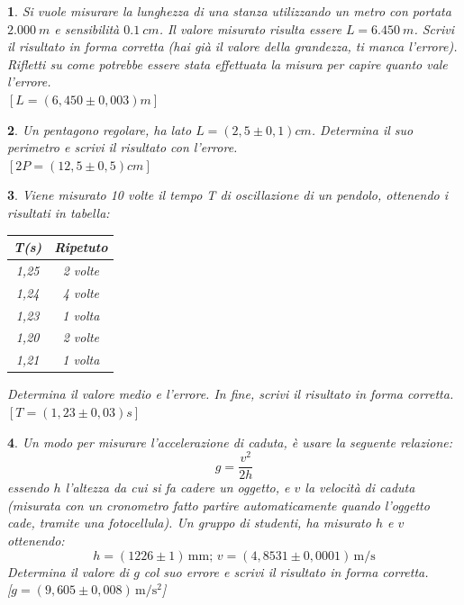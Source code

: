 \documentclass[12pt,a4paper,oneside]{book}
\theoremstyle{esercizio}
\newtheorem{esercizio}{}
\begin{document}
\begin{esercizio}
Si vuole misurare la lunghezza di una stanza utilizzando un metro con portata $\SI{2,000}{m}$ e sensibilità $\SI{0,1}{cm}$. Il valore misurato risulta essere $L=\SI{6,450}{m}$. Scrivi il risultato in forma corretta (hai già il valore della grandezza, ti manca l'errore). Rifletti su come potrebbe essere stata effettuata la misura per capire quanto vale l'errore.\\
 \hspace*{\fill}  $\left[L=\left(6,450 \pm 0,003\right)\si{m}\right]$
\end{esercizio}

\begin{esercizio}
Un pentagono regolare, ha lato $L=\left(2,5 \pm 0,1\right)\si{cm}$. Determina il suo perimetro e scrivi il risultato con l'errore.\\
 \hspace*{\fill}   $\left[2P=\left(12,5 \pm 0,5\right)\si{cm}\right]$
\end{esercizio}
\begin{esercizio}
Viene misurato 10 volte il tempo T di oscillazione di un pendolo, ottenendo i risultati in tabella:

\begin{center}
\begin{tabular}{|c|c|}
\hline 
T(s)& Ripetuto\\
\hline
1,25 & 2 volte\\
1,24 & 4 volte \\
1,23 & 1 volta \\
1,20 & 2 volte \\
1,21 & 1 volta \\
\hline
\end{tabular}
\end{center}
Determina il valore medio e l'errore. In fine, scrivi il risultato in forma corretta.\\
\hspace*{\fill}   $\left[T=\left(1,23 \pm 0,03\right)\si{s}\right]$
\end{esercizio}
\begin{esercizio}
Un modo per misurare l'accelerazione di caduta, è usare la seguente relazione:
\[
g=\frac{v^2}{2 h}
\]
essendo $h$ l'altezza da cui si fa cadere un oggetto, e $v$ la velocità di caduta (misurata con un cronometro fatto partire automaticamente quando l'oggetto cade, tramite una fotocellula). Un gruppo di studenti, ha misurato $h$ e $v$ ottenendo:
\[
h=\left(1226 \pm 1 \right) \, \si{\milli\meter} \text{;}\,\, v=\left(4,8531 \pm  0,0001\right) \, \si{\meter\per\second} 
\]
Determina il valore di $g$ col suo errore e scrivi il risultato in forma corretta. \\\hspace*{\fill} [$g=\left(9,605 \pm 0,008 \right) \, \si{\meter\per\square\second}$] 
\end{esercizio}
\end{document}

